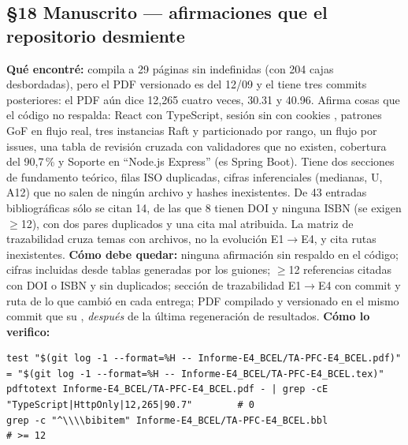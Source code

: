 \subsection*{\S18 Manuscrito --- afirmaciones que el repositorio desmiente}
\textbf{Qu\'e encontr\'e:} compila a 29 p\'aginas sin indefinidas (con 204 cajas desbordadas), pero el PDF versionado es del 12/09 y el  tiene tres commits posteriores: el PDF a\'un dice 12,265 cuatro veces, 30.31 y 40.96. Afirma cosas que el c\'odigo no respalda: React con TypeScript, sesi\'on sin  con cookies , patrones GoF en flujo real, tres instancias Raft y particionado por rango, un flujo por issues, una tabla de revisi\'on cruzada con validadores que no existen, cobertura del 90,7\,\% y Soporte en ``Node.js Express'' (es Spring Boot). Tiene dos secciones de fundamento te\'orico, filas ISO duplicadas, cifras inferenciales (medianas, U, A12) que no salen de ning\'un archivo y hashes inexistentes. De 43 entradas bibliogr\'aficas s\'olo se citan 14, de las que 8 tienen DOI y ninguna ISBN (se exigen $\ge$12), con dos pares duplicados y una cita mal atribuida. La matriz de trazabilidad cruza temas con archivos, no la evoluci\'on E1$\rightarrow$E4, y cita rutas inexistentes. \textbf{C\'omo debe quedar:} ninguna afirmaci\'on sin respaldo en el c\'odigo; cifras incluidas desde tablas generadas por los guiones; $\ge$12 referencias citadas con DOI o ISBN y sin duplicados; secci\'on de trazabilidad E1$\rightarrow$E4 con commit y ruta de lo que cambi\'o en cada entrega; PDF compilado y versionado en el mismo commit que su , \emph{despu\'es} de la \'ultima regeneraci\'on de resultados. \textbf{C\'omo lo verifico:}\begin{verbatim}
test "$(git log -1 --format=%H -- Informe-E4_BCEL/TA-PFC-E4_BCEL.pdf)" = "$(git log -1 --format=%H -- Informe-E4_BCEL/TA-PFC-E4_BCEL.tex)"
pdftotext Informe-E4_BCEL/TA-PFC-E4_BCEL.pdf - | grep -cE "TypeScript|HttpOnly|12,265|90.7"        # 0
grep -c "^\\\\bibitem" Informe-E4_BCEL/TA-PFC-E4_BCEL.bbl                                          # >= 12
\end{verbatim}

